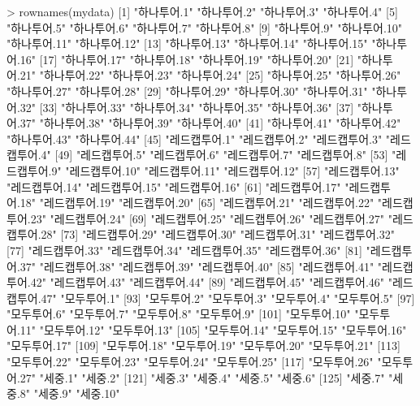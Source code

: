 \documentclass[tutorial.tex]{subfiles}
\begin{document}
\begin{Schunk}
\begin{Soutput}
> rownames(mydata)
  [1] "하나투어.1"      "하나투어.2"      "하나투어.3"      "하나투어.4"     
  [5] "하나투어.5"      "하나투어.6"      "하나투어.7"      "하나투어.8"     
  [9] "하나투어.9"      "하나투어.10"     "하나투어.11"     "하나투어.12"    
 [13] "하나투어.13"     "하나투어.14"     "하나투어.15"     "하나투어.16"    
 [17] "하나투어.17"     "하나투어.18"     "하나투어.19"     "하나투어.20"    
 [21] "하나투어.21"     "하나투어.22"     "하나투어.23"     "하나투어.24"    
 [25] "하나투어.25"     "하나투어.26"     "하나투어.27"     "하나투어.28"    
 [29] "하나투어.29"     "하나투어.30"     "하나투어.31"     "하나투어.32"    
 [33] "하나투어.33"     "하나투어.34"     "하나투어.35"     "하나투어.36"    
 [37] "하나투어.37"     "하나투어.38"     "하나투어.39"     "하나투어.40"    
 [41] "하나투어.41"     "하나투어.42"     "하나투어.43"     "하나투어.44"    
 [45] "레드캡투어.1"    "레드캡투어.2"    "레드캡투어.3"    "레드캡투어.4"   
 [49] "레드캡투어.5"    "레드캡투어.6"    "레드캡투어.7"    "레드캡투어.8"   
 [53] "레드캡투어.9"    "레드캡투어.10"   "레드캡투어.11"   "레드캡투어.12"  
 [57] "레드캡투어.13"   "레드캡투어.14"   "레드캡투어.15"   "레드캡투어.16"  
 [61] "레드캡투어.17"   "레드캡투어.18"   "레드캡투어.19"   "레드캡투어.20"  
 [65] "레드캡투어.21"   "레드캡투어.22"   "레드캡투어.23"   "레드캡투어.24"  
 [69] "레드캡투어.25"   "레드캡투어.26"   "레드캡투어.27"   "레드캡투어.28"  
 [73] "레드캡투어.29"   "레드캡투어.30"   "레드캡투어.31"   "레드캡투어.32"  
 [77] "레드캡투어.33"   "레드캡투어.34"   "레드캡투어.35"   "레드캡투어.36"  
 [81] "레드캡투어.37"   "레드캡투어.38"   "레드캡투어.39"   "레드캡투어.40"  
 [85] "레드캡투어.41"   "레드캡투어.42"   "레드캡투어.43"   "레드캡투어.44"  
 [89] "레드캡투어.45"   "레드캡투어.46"   "레드캡투어.47"   "모두투어.1"     
 [93] "모두투어.2"      "모두투어.3"      "모두투어.4"      "모두투어.5"     
 [97] "모두투어.6"      "모두투어.7"      "모두투어.8"      "모두투어.9"     
[101] "모두투어.10"     "모두투어.11"     "모두투어.12"     "모두투어.13"    
[105] "모두투어.14"     "모두투어.15"     "모두투어.16"     "모두투어.17"    
[109] "모두투어.18"     "모두투어.19"     "모두투어.20"     "모두투어.21"    
[113] "모두투어.22"     "모두투어.23"     "모두투어.24"     "모두투어.25"    
[117] "모두투어.26"     "모두투어.27"     "세중.1"          "세중.2"         
[121] "세중.3"          "세중.4"          "세중.5"          "세중.6"         
[125] "세중.7"          "세중.8"          "세중.9"          "세중.10"        

\end{Soutput}
\end{Schunk}
\end{document}
